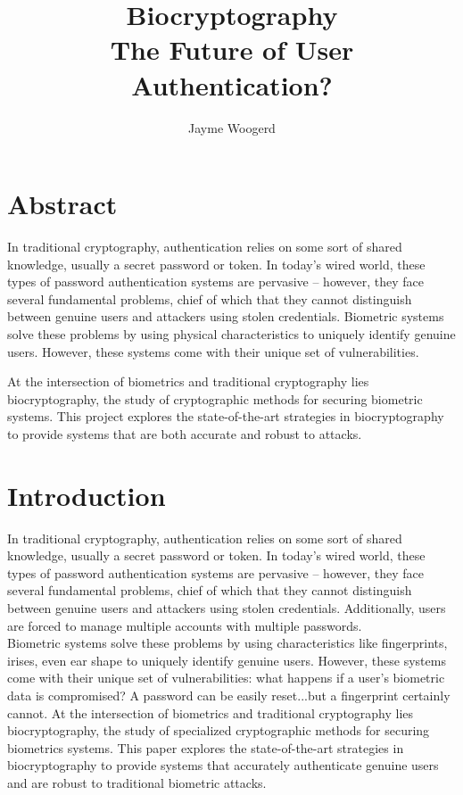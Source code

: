 \documentclass[11pt]{article}
\begin{document}
\author{Jayme Woogerd}
\title{Biocryptography \\ {\large The Future of User Authentication?}}
\maketitle

\section*{Abstract}
In traditional cryptography, authentication relies on some sort of shared knowledge,
usually a secret password or token. In today's wired world, these types of password
authentication systems are pervasive -- however, they face several fundamental
problems, chief of which that they cannot distinguish between genuine users and
attackers using stolen credentials. Biometric systems solve these problems by 
using physical characteristics to uniquely identify genuine users. However, 
these systems come with their unique set of vulnerabilities.

At the intersection of biometrics and traditional cryptography lies 
biocryptography, the study of cryptographic methods for securing biometric 
systems. This project explores the state-of-the-art strategies 
in biocryptography to provide systems that are both accurate and robust to attacks.

\doublespacing
\section{Introduction}
In traditional cryptography, authentication relies on some sort of shared knowledge,
usually a secret password or token. In today's wired world, these types of password
authentication systems are pervasive -- however, they face several fundamental
problems, chief of which that they cannot distinguish between genuine users and
attackers using stolen credentials. Additionally, users are forced to manage 
multiple accounts with multiple passwords.  \\
Biometric systems solve these problems by using characteristics like fingerprints,
irises, even ear shape to uniquely identify genuine users. However, these
systems come with their unique set of vulnerabilities: what happens if a user's
biometric data is compromised? A password can be easily reset...but a fingerprint
certainly cannot. At the intersection of biometrics and traditional cryptography
lies biocryptography, the study of specialized cryptographic methods for securing 
biometrics systems. This paper explores the state-of-the-art strategies in 
biocryptography to provide systems that accurately authenticate genuine users 
and are robust to traditional biometric attacks.
\end{document}
